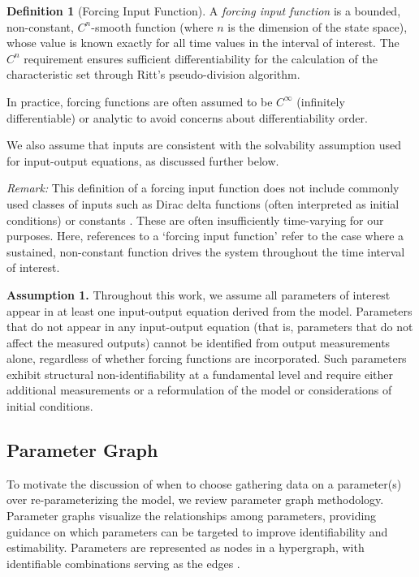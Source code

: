 \documentclass[a4paper,fleqn]{cas-dc}
\theoremstyle{definition}
\newtheorem{definition}{Definition}
\begin{document}
\begin{definition}[Forcing Input Function]
A \textit{forcing input function} is a bounded, non-constant, $C^n$-smooth function (where $n$ is the dimension of the state space), whose value is known exactly for all time values in the interval of interest. The $C^n$ requirement ensures sufficient differentiability for the calculation of the characteristic set through Ritt's pseudo-division algorithm.
\end{definition}

In practice, forcing functions are often assumed to be $C^\infty$ (infinitely differentiable) or analytic to avoid concerns about differentiability order.

We also assume that inputs are consistent with the solvability assumption used for input-output equations, as discussed further below.

\setlength{\leftskip}{0.5cm}
\vspace{0.2cm}
\noindent \textit{Remark: }
    This definition of a forcing input function does not include commonly used classes of inputs such as Dirac delta functions (often interpreted as initial conditions) or constants \cite{audoly2001global, eisenbergDeterminingIdentifiableParameter2014, meshkat2015identifiability}. 
    These are often insufficiently time-varying for our purposes.
    Here, references to a `forcing input function' refer to the case where a sustained, non-constant function drives the system throughout the time interval of interest.
\setlength{\leftskip}{0cm}
\medskip

\noindent \textbf{Assumption 1.}
Throughout this work, we assume all parameters of interest appear in at least one input-output equation derived from the model. Parameters that do not appear in any input-output equation (that is, parameters that do not affect the measured outputs) cannot be identified from output measurements alone, regardless of whether forcing functions are incorporated. Such parameters exhibit structural non-identifiability at a fundamental level and require either additional measurements or a reformulation of the model or considerations of initial conditions.

\subsection{Parameter Graph} \label{ss:paramgraph}
\noindent To motivate the discussion of when to choose gathering data on a parameter(s) over re-parameterizing the model, we review parameter graph methodology. 
Parameter graphs visualize the relationships among parameters, providing guidance on which parameters can be targeted to improve identifiability and estimability.
Parameters are represented as nodes in a hypergraph, with identifiable combinations serving as the edges \cite{eisenbergDeterminingIdentifiableParameter2014}.
\end{document}
